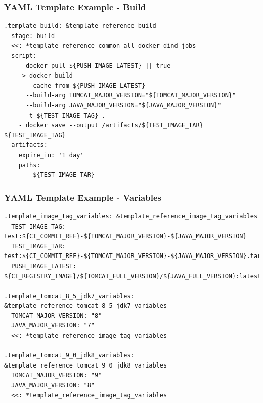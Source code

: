 \documentclass[14pt,aspectratio=169]{beamer}
\begin{document}
\begin{frame}[fragile]
  \frametitle{YAML Template Example - Build}
  \begin{verbatim}
.template_build: &template_reference_build
  stage: build
  <<: *template_reference_common_all_docker_dind_jobs
  script:
    - docker pull ${PUSH_IMAGE_LATEST} || true
    -> docker build
      --cache-from ${PUSH_IMAGE_LATEST}
      --build-arg TOMCAT_MAJOR_VERSION="${TOMCAT_MAJOR_VERSION}"
      --build-arg JAVA_MAJOR_VERSION="${JAVA_MAJOR_VERSION}"
      -t ${TEST_IMAGE_TAG} .
    - docker save --output /artifacts/${TEST_IMAGE_TAR} ${TEST_IMAGE_TAG}
  artifacts:
    expire_in: '1 day'
    paths:
      - ${TEST_IMAGE_TAR}
  \end{verbatim}
\end{frame}

\begin{frame}[fragile]
  \frametitle{YAML Template Example - Variables}
  \begin{verbatim}
.template_image_tag_variables: &template_reference_image_tag_variables
  TEST_IMAGE_TAG: test:${CI_COMMIT_REF}-${TOMCAT_MAJOR_VERSION}-${JAVA_MAJOR_VERSION}
  TEST_IMAGE_TAR: test:${CI_COMMIT_REF}-${TOMCAT_MAJOR_VERSION}-${JAVA_MAJOR_VERSION}.tar
  PUSH_IMAGE_LATEST: ${CI_REGISTRY_IMAGE}/${TOMCAT_FULL_VERSION}/${JAVA_FULL_VERSION}:latest

.template_tomcat_8_5_jdk7_variables: &template_reference_tomcat_8_5_jdk7_variables
  TOMCAT_MAJOR_VERSION: "8"
  JAVA_MAJOR_VERSION: "7"
  <<: *template_reference_image_tag_variables

.template_tomcat_9_0_jdk8_variables: &template_reference_tomcat_9_0_jdk8_variables
  TOMCAT_MAJOR_VERSION: "9"
  JAVA_MAJOR_VERSION: "8"
  <<: *template_reference_image_tag_variables
  \end{verbatim}
\end{frame}
\end{document}
